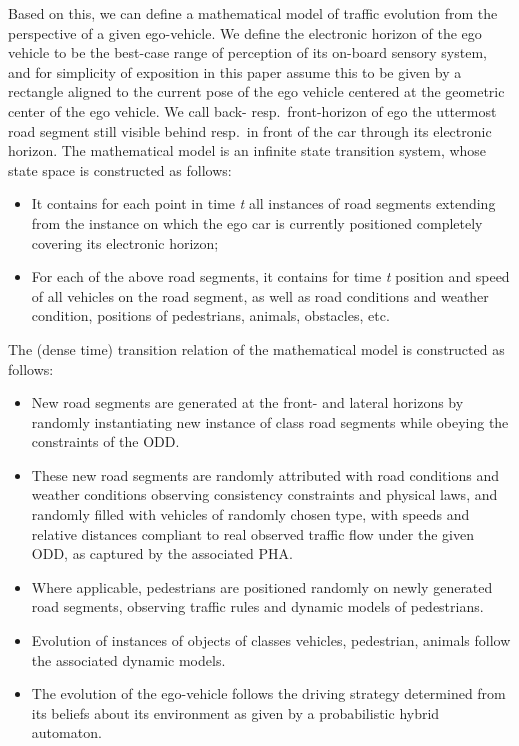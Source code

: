 Based on this, we can define a mathematical model of traffic evolution from the perspective of a given ego-vehicle. We define the electronic horizon of the ego vehicle to be the best-case range of perception of its on-board sensory system, and for simplicity of exposition in this paper assume this to be given by a rectangle aligned to the current pose of the ego vehicle centered at the geometric center of the ego vehicle. We call back- resp.\  front-horizon of ego the uttermost road segment still visible behind resp.\ in front of the car through its electronic horizon. The mathematical model is an infinite state transition system, whose state space is constructed as follows:
\begin{itemize}
\item It contains for each point in time \emph{t}  all instances of road segments extending from the instance on which the ego car is currently positioned completely covering its electronic horizon;
\item For each of the above road segments, it contains for time \emph{t} position and speed of all vehicles on the road segment, as well as road conditions and weather condition, positions of pedestrians, animals, obstacles, etc.
\end{itemize}
The (dense time) transition relation of the mathematical model is constructed as follows:
\begin{itemize}
\item New road segments are generated at the front- and lateral horizons by randomly instantiating new instance of class road segments while obeying the constraints of the ODD.
\item These new road segments are randomly attributed with road conditions and weather conditions observing consistency constraints and physical laws, and randomly filled with vehicles of randomly chosen type, with speeds and relative distances compliant to real observed traffic flow under the given ODD, as captured by the associated PHA.
\item Where applicable, pedestrians are positioned randomly on newly generated road segments, observing traffic rules and dynamic models of pedestrians.
\item Evolution of instances of objects of classes vehicles, pedestrian, animals follow the associated dynamic models.
\item The evolution of the ego-vehicle follows the driving strategy determined from its beliefs about its environment as given by a probabilistic hybrid automaton.
\end{itemize}
